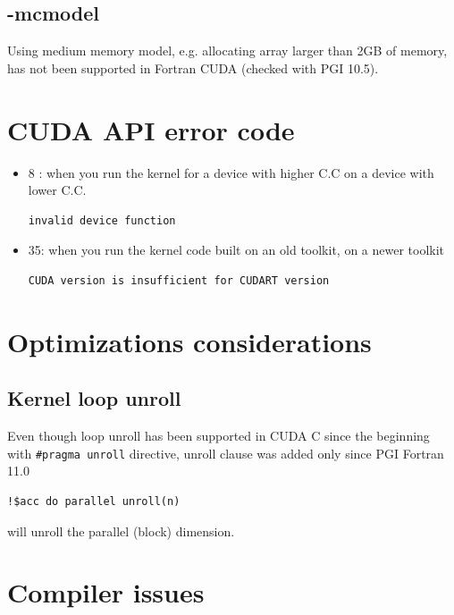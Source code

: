 \subsection{-mcmodel}
\label{sec:-mcmodel}

Using medium memory model, e.g. allocating array larger than 2GB of
memory, has not been supported in Fortran CUDA (checked with PGI
10.5). 

\section{CUDA API error code}
\label{sec:cuda-api-error}

\begin{itemize}
\item 8 : when you run the kernel for a device with higher C.C on a
  device with lower C.C.
\begin{verbatim}
invalid device function
\end{verbatim}

\item 35: when you run the kernel code built on an old toolkit, on a
  newer toolkit
\begin{verbatim}
CUDA version is insufficient for CUDART version
\end{verbatim}

\end{itemize}

\section{Optimizations considerations}
\label{sec:optim-cons-1}

\subsection{Kernel loop unroll}
\label{sec:kernel-loop-unroll}

Even though loop unroll has been supported in CUDA C since the
beginning with \verb!#pragma unroll! directive, unroll clause was
added only since PGI Fortran 11.0 
\begin{lstlisting}
!$acc do parallel unroll(n)
\end{lstlisting}
will unroll the parallel (block) dimension. 

\section{Compiler issues}
\label{sec:global-subroutine}

